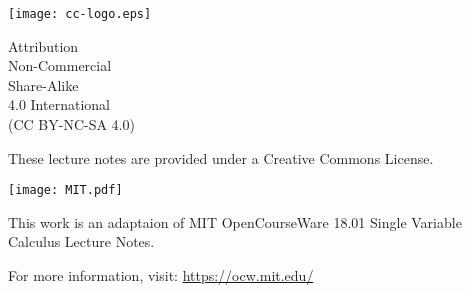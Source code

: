 \documentclass[./main.tex]{subfiles}
\begin{document}
\thispagestyle{empty}

\phantom{text}
\vfill
\texttt{[image: cc-logo.eps]}
\scriptsize

Attribution\\
Non-Commercial\\
Share-Alike\\
4.0 International\\
(CC BY-NC-SA 4.0)

\small
These lecture notes are provided under a Creative Commons License.
\vspace{1cm}

\texttt{[image: MIT.pdf]}

This work is an adaptaion of 
MIT OpenCourseWare 18.01 Single Variable Calculus Lecture Notes.

For more information, visit: \url{https://ocw.mit.edu/}
\end{document}
